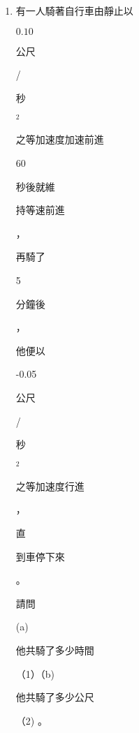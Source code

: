 \documentclass[10pt]{article}
\begin{document}
\begin{enumerate}
  \item \begin{CJK}{UTF8}{mj}有一人騎著自行車由靜止以\end{CJK} $0.10$ \begin{CJK}{UTF8}{mj}公尺\end{CJK}/\begin{CJK}{UTF8}{mj}秒\end{CJK} $^{2}$ \begin{CJK}{UTF8}{mj}之等加速度加速前進\end{CJK} 60 \begin{CJK}{UTF8}{mj}秒後就維\end{CJK} \begin{CJK}{UTF8}{mj}持等速前進\end{CJK}，\begin{CJK}{UTF8}{mj}再騎了\end{CJK} 5 \begin{CJK}{UTF8}{mj}分鐘後\end{CJK}，\begin{CJK}{UTF8}{mj}他便以\end{CJK}-0.05 \begin{CJK}{UTF8}{mj}公尺\end{CJK}/\begin{CJK}{UTF8}{mj}秒\end{CJK} $^{2}$ \begin{CJK}{UTF8}{mj}之等加速度行進\end{CJK}，\begin{CJK}{UTF8}{mj}直\end{CJK} \begin{CJK}{UTF8}{mj}到車停下來\end{CJK}。\begin{CJK}{UTF8}{mj}請問\end{CJK}(a)\begin{CJK}{UTF8}{mj}他共騎了多少時間\end{CJK}（1）（b)\begin{CJK}{UTF8}{mj}他共騎了多少公尺\end{CJK}（2) 。


\end{enumerate}
\end{document}
